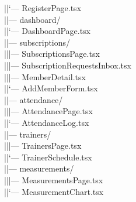 \documentclass[11pt,a4paper]{article}
\begin{document}
{|\hspace{1.5em}|\hspace{1.5em}`--- RegisterPage.tsx\\
|\hspace{1.5em}|--- dashboard/\\
|\hspace{1.5em}|\hspace{1.5em}`--- DashboardPage.tsx\\
|\hspace{1.5em}|--- subscriptions/\\
|\hspace{1.5em}|\hspace{1.5em}|--- SubscriptionsPage.tsx\\
|\hspace{1.5em}|\hspace{1.5em}|--- SubscriptionRequestsInbox.tsx\\
|\hspace{1.5em}|\hspace{1.5em}|--- MemberDetail.tsx\\
|\hspace{1.5em}|\hspace{1.5em}`--- AddMemberForm.tsx\\
|\hspace{1.5em}|--- attendance/\\
|\hspace{1.5em}|\hspace{1.5em}|--- AttendancePage.tsx\\
|\hspace{1.5em}|\hspace{1.5em}`--- AttendanceLog.tsx\\
|\hspace{1.5em}|--- trainers/\\
|\hspace{1.5em}|\hspace{1.5em}|--- TrainersPage.tsx\\
|\hspace{1.5em}|\hspace{1.5em}`--- TrainerSchedule.tsx\\
|\hspace{1.5em}|--- measurements/\\
|\hspace{1.5em}|\hspace{1.5em}|--- MeasurementsPage.tsx\\
|\hspace{1.5em}|\hspace{1.5em}`--- MeasurementChart.tsx\\
}
\end{document}
